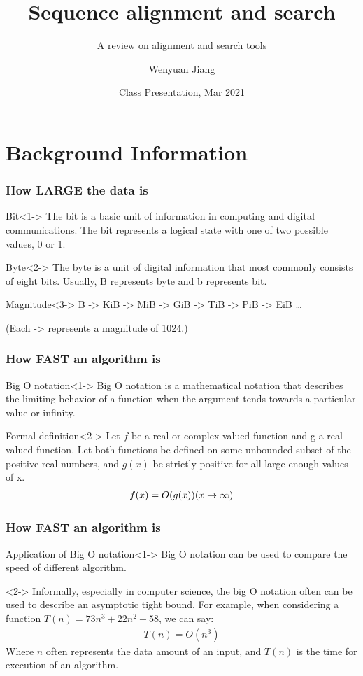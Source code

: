 \documentclass[UTF8]{beamer}
\title{Sequence alignment and search}
\subtitle{A review on alignment and search tools}
\author[School of Life Science] %
{Wenyuan Jiang\inst{1}}
\institute[Tongji University] %
{
	\inst{1}%
	School of Life Science\\
	Tongji University
}
\date[Mar 2021] %
{Class Presentation, Mar 2021}
\begin{document}
	\frame{\titlepage}
	\section{Background Information}

	\begin{frame}
	    \frametitle{How LARGE the data is}
		\begin{block}{Bit}<1->
			The bit is a basic unit of information in computing and digital communications. The bit represents a logical state with one of two possible values, 0 or 1.
		\end{block}
		\begin{block}{Byte}<2->
			The byte is a unit of digital information that most commonly consists of \alert{eight bits}. Usually, B represents byte and b represents bit.
		\end{block}
		\begin{block}{Magnitude}<3->
			B -> KiB -> MiB -> GiB -> TiB -> PiB -> EiB \dots

			(Each -> represents a magnitude of 1024.)
		\end{block}

    \end{frame}

	\begin{frame}
	    \frametitle{How FAST an algorithm is}
		\begin{block}{Big O notation}<1->
			Big O notation is a mathematical notation that describes the limiting behavior of a function when the argument tends towards a particular value or infinity.
		\end{block}
		\begin{block}{Formal definition}<2->
			Let $f$ be a real or complex valued function and g a real valued function. Let both functions be defined on some unbounded subset of the positive real numbers, and $g(x)$ be strictly positive for all large enough values of x.
			\begin{gather*}
				f(x)=O(g(x)) \space (x \rightarrow \infty)
			\end{gather*}
		\end{block}
    \end{frame}

	\begin{frame}
	    \frametitle{How FAST an algorithm is}
		\begin{block}{Application of Big O notation}<1->
			Big O notation can be used to compare the speed of different algorithm.
		\end{block}
		\begin{example}<2->
			Informally, especially in computer science, the big O notation often can be used to describe an asymptotic tight bound.
			For example, when considering a function $T(n) = 73n^3 + 22n^2 + 58$, we can say:
			\begin{gather*}
				T(n)=O(n^3)
			\end{gather*}
			Where $n$ often represents the data amount of an input, and $T(n)$ is the time for execution of an algorithm.
		\end{example}
    \end{frame}
\end{document}
